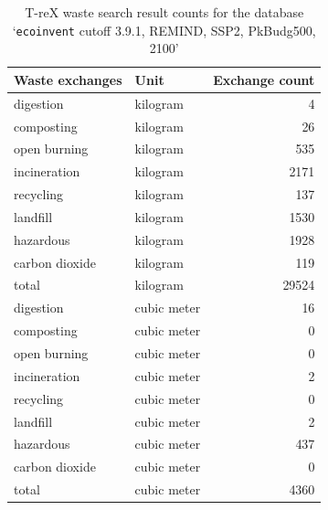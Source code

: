 \documentclass{article}
\renewcommand{\texttt}[1]{{\ttfamily\small\nolinkurl{#1}}}
\begin{document}
\begin{table}[ht]
    \centering
    \caption{T-reX waste search result counts for the database `\texttt{ecoinvent} cutoff 3.9.1, REMIND, SSP2, PkBudg500, 2100'}\label{tab:wf_results}
    \begin{tabular}{llr}
        \toprule
        \textbf{Waste exchanges} & \textbf{Unit} & \textbf{Exchange count} \\
        \midrule
        digestion                & kilogram      & 4                       \\
        composting               & kilogram      & 26                      \\
        open burning             & kilogram      & 535                     \\
        incineration             & kilogram      & 2171                    \\
        recycling                & kilogram      & 137                     \\
        landfill                 & kilogram      & 1530                    \\
        hazardous                & kilogram      & 1928                    \\
        carbon dioxide           & kilogram      & 119                     \\
        total                    & kilogram      & 29524                   \\
        digestion                & cubic meter   & 16                      \\
        composting               & cubic meter   & 0                       \\
        open burning             & cubic meter   & 0                       \\
        incineration             & cubic meter   & 2                       \\
        recycling                & cubic meter   & 0                       \\
        landfill                 & cubic meter   & 2                       \\
        hazardous                & cubic meter   & 437                     \\
        carbon dioxide           & cubic meter   & 0                       \\
        total                    & cubic meter   & 4360                    \\
        \bottomrule
    \end{tabular}
\end{table}
\end{document}
